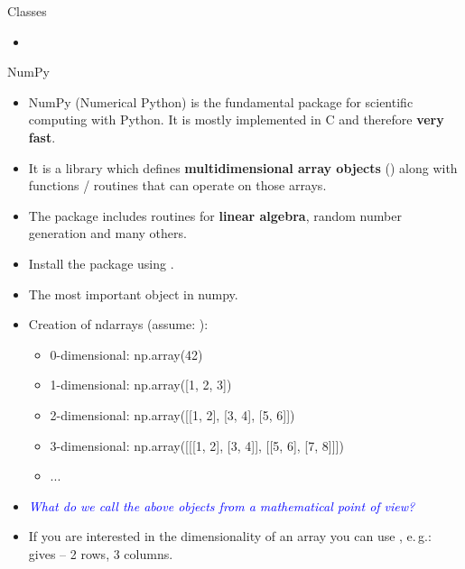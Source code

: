 
\begin{dwHeaderFrame}{Classes}
	\begin{itemize}
		\item
	\end{itemize}
\end{dwHeaderFrame}



\begin{dwHeaderFrame}{NumPy}
	\begin{itemize}
		\item NumPy (Numerical Python) is the fundamental package for scientific computing with Python.
			It is mostly implemented in C and therefore \textbf{very fast}.
		\item It is a library which defines \textbf{multidimensional array objects} () along with functions / routines
			that can operate on those arrays.
		\item The package includes routines for \textbf{linear algebra}, random number generation and many others.
		\item Install the package using .
	\end{itemize}
\end{dwHeaderFrame}


\begin{frame}
	\begin{itemize}
		\item The most important object in numpy.
		\item Creation of ndarrays (assume: ):
		\begin{itemize}
			\item 0-dimensional: np.array(42)
			\item 1-dimensional: np.array([1, 2, 3])
			\item 2-dimensional: np.array([[1, 2], [3, 4], [5, 6]])
			\item 3-dimensional: np.array([[[1, 2], [3, 4]], [[5, 6], [7, 8]]])
			\item ...
		\end{itemize}
		\item \textcolor{blue}{\textit{What do we call the above objects from a mathematical point of view?}}
		\item If you are interested in the dimensionality of an array you can use , e.\,g.: \\
			 gives  -- 2 rows, 3 columns.
	\end{itemize}
\end{frame}


